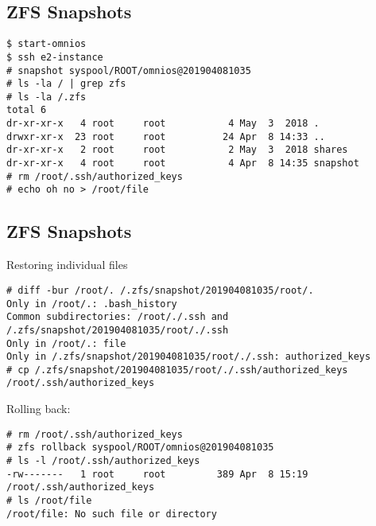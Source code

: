 \documentclass[xga]{xdvislides}
\begin{document}
\subsection{ZFS Snapshots}
\smallish
\begin{verbatim}
$ start-omnios
$ ssh e2-instance
# snapshot syspool/ROOT/omnios@201904081035
# ls -la / | grep zfs
# ls -la /.zfs
total 6
dr-xr-xr-x   4 root     root           4 May  3  2018 .
drwxr-xr-x  23 root     root          24 Apr  8 14:33 ..
dr-xr-xr-x   2 root     root           2 May  3  2018 shares
dr-xr-xr-x   4 root     root           4 Apr  8 14:35 snapshot
# rm /root/.ssh/authorized_keys
# echo oh no > /root/file
\end{verbatim}
\Normalsize

\subsection{ZFS Snapshots}
Restoring individual files
\smallish
\begin{verbatim}
# diff -bur /root/. /.zfs/snapshot/201904081035/root/.
Only in /root/.: .bash_history
Common subdirectories: /root/./.ssh and /.zfs/snapshot/201904081035/root/./.ssh
Only in /root/.: file
Only in /.zfs/snapshot/201904081035/root/./.ssh: authorized_keys
# cp /.zfs/snapshot/201904081035/root/./.ssh/authorized_keys /root/.ssh/authorized_keys
\end{verbatim}

\vspace{.5in}
Rolling back:
\begin{verbatim}
# rm /root/.ssh/authorized_keys
# zfs rollback syspool/ROOT/omnios@201904081035
# ls -l /root/.ssh/authorized_keys
-rw-------   1 root     root         389 Apr  8 15:19 /root/.ssh/authorized_keys
# ls /root/file
/root/file: No such file or directory
\end{verbatim}
\Normalsize
\end{document}
